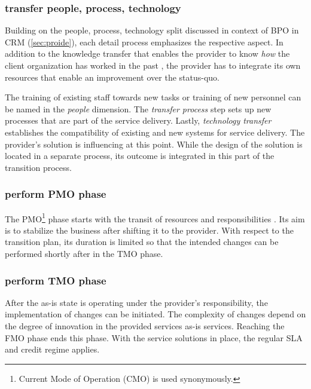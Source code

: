 	\subsubsection{transfer people, process, technology}
	
	Building on the people, process, technology split discussed in context of  \acrshort{BPO} in \acrshort{CRM} (\cf \ref{sec:proide}), each detail process emphasizes the respective aspect. In addition to the knowledge transfer that enables the provider to know \textit{how} the client organization has worked in the past \citep{perunovic2007outsourcing}, the provider has to integrate its own resources that enable an improvement over the status-quo.
	
	The training of existing staff towards new tasks or training of new personnel can be named in the \textit{people} dimension. The \textit{transfer process} step sets up new processes that are part of the service delivery. Lastly, \textit{technology transfer} establishes the compatibility of existing and new systems for service delivery. The provider's solution is influencing at this point. While the design of the solution is located in a separate process, its outcome is integrated in this part of the transition process. 
	
	\subsubsection{perform \acrshort{PMO} phase}
	The \acrshort{PMO}\footnote{Current Mode of Operation (CMO) is used synonymously. } phase starts with the transit of resources and responsibilities \citep{bitkom2008}. Its aim is to stabilize the business after shifting it to the provider. With respect to the transition plan, its duration is limited so that the intended changes can be performed shortly after in the \acrshort{TMO} phase.
	
	\subsubsection{perform \acrshort{TMO} phase}
	After the as-is state is operating under the provider's responsibility, the implementation of changes can be initiated. The complexity of changes depend on the degree of innovation in the provided services \wrt as-is services. Reaching the \acrshort{FMO} phase ends this phase. With the service solutions in place, the regular \acrshort{SLA} and credit regime applies.
	

	
